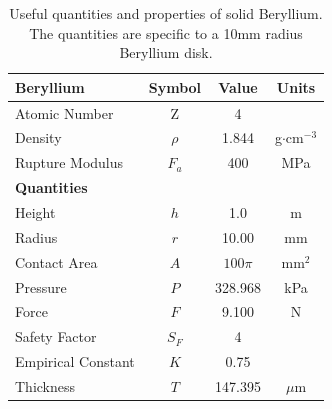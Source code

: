 \documentclass[%
reprint,
nofootinbib,
amsmath, amssymb,
aps,
floatfix,
]{revtex4-2}
\begin{document}
\begin{table}[H]
    \centering
    \begin{tabular}{lccc}
        \hline \hline
        \textbf{Beryllium} & \textbf{Symbol} & \textbf{Value} & \textbf{Units} \\
        \hline
        Atomic Number & Z & 4 & \\
        Density & $\rho$ & 1.844 & g$\cdot$cm$^{-3}$ \\
        Rupture Modulus & $F_a$ & 400 & MPa \\
        \hline \hline
        \textbf{Quantities} \\
        \hline
        Height
        & $h$ & 1.0 & m \\
        Radius & $r$ & 10.00 & mm \\
        Contact Area & $A$ & $100\pi$ & mm$^2$ \\
        Pressure & $P$ & 328.968 & kPa \\
        Force & $F$ & 9.100 & N \\
        Safety Factor & $S_F$ & 4 \\
        Empirical Constant & $K$ & 0.75 \\
        Thickness & $T$ & 147.395 & $\mu$m \\
        \hline \hline
    \end{tabular}
    \caption{\label{tab:BeInfo}Useful quantities and properties of solid Beryllium.
    The quantities are specific to a 10mm radius Beryllium disk.}
\end{table}
\end{document}
